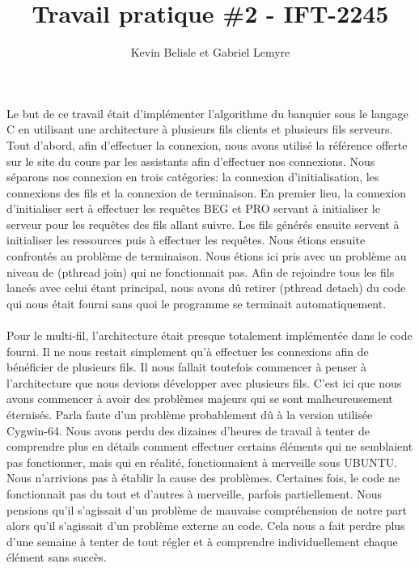 \documentclass[11pt]{article}
\title{Travail pratique \#2 - IFT-2245}
\author{Kevin Belisle et Gabriel Lemyre}
\begin{document}
\maketitle

Le but de ce travail était d'implémenter l'algorithme du banquier sous le langage C en utilisant une architecture à plusieurs fils clients et plusieurs fils serveurs.\\

Tout d'abord, afin d'effectuer la connexion, nous avons utilisé la référence offerte sur le site du cours par les assistants afin d'effectuer nos connexions. Nous séparons nos connexion en trois catégories: la connexion d'initialisation, les connexions des fils et la connexion de terminaison. En premier lieu, la connexion d'initialiser sert à effectuer les requêtes BEG et PRO servant à initialiser le serveur pour les requêtes des fils allant suivre. Les fils générés ensuite servent à initialiser les ressources puis à effectuer les requêtes. Nous étions ensuite confrontés au problème de terminaison. Nous étions ici pris avec un problème au niveau de (pthread join) qui ne fonctionnait pas. Afin de rejoindre tous les fils lancés avec celui étant principal, nous avons dû retirer (pthread detach) du code qui nous était fourni sans quoi le programme se terminait automatiquement. 
\\\\

Pour le multi-fil, l'architecture était presque totalement implémentée dans le code fourni. Il ne nous restait simplement qu'à effectuer les connexions afin de bénéficier de plusieurs fils. Il nous fallait toutefois commencer à penser à l'architecture que nous devions développer avec plusieurs fils. C'est ici que nous avons commencer à avoir des problèmes majeurs qui se sont malheureusement éternisés. Parla faute d'un problème probablement dû à la version utilisée Cygwin-64. Nous avons perdu des dizaines d'heures de travail à tenter de comprendre plus en détails comment effectuer certains éléments qui ne semblaient pas fonctionner, mais qui en réalité, fonctionnaient à merveille sous UBUNTU. Nous n'arrivions pas à établir la cause des problèmes. Certaines fois, le code ne fonctionnait pas du tout et d'autres à merveille, parfois partiellement. Nous pensions qu'il s'agissait d'un problème de mauvaise compréhension de notre part alors qu'il s'agissait d'un problème externe au code. Cela nous a fait perdre plus d'une semaine à tenter de tout régler et à comprendre individuellement chaque élément sans succès.\\\\
\end{document}
